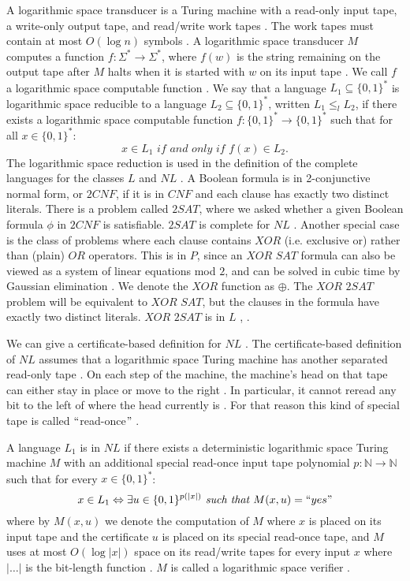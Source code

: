 \documentclass[a4paper,UKenglish,cleveref, autoref]{lipics-v2019}
\begin{document}
A logarithmic space transducer is a Turing machine with a read-only input tape, a write-only output tape, and read/write work tapes \cite{MS06}. The work tapes must contain at most $O(\log n)$ symbols \cite{MS06}. A logarithmic space transducer $M$ computes a function $f : \Sigma^{*} \rightarrow \Sigma^{*}$, where $f(w)$ is the string remaining on the output tape after $M$ halts when it is started with $w$ on its input tape \cite{MS06}. We call $f$ a logarithmic space computable function \cite{MS06}. We say that a language $L_{1} \subseteq \{0, 1\}^{*}$ is logarithmic space reducible to a language $L_{2} \subseteq \{0, 1\}^{*}$, written $L_{1} \leq_{l} L_{2}$, if there exists a logarithmic space computable function $f : \{0, 1\}^{*} \rightarrow \{0, 1\}^{*}$ such that for all $x \in \{0, 1\}^{*}$:
\[x \in L_{1} \textit{ if and only if } f(x) \in L_{2}.\]
The logarithmic space reduction is used in the definition of the complete languages for the classes $L$ and $NL$ \cite{Pap03}. A Boolean formula is in 2-conjunctive normal form, or $2CNF$, if it is in $CNF$ and each clause has exactly two distinct literals. There is a problem called $2SAT$, where we asked whether a given Boolean formula $\phi$ in $2CNF$ is satisfiable. $2SAT$ is complete for $NL$ \cite{Pap03}. Another special case is the class of problems where each clause contains $XOR$ (i.e. exclusive or) rather than (plain) $OR$ operators. This is in $P$, since an $\textit{XOR SAT}$ formula can also be viewed as a system of linear equations mod $2$, and can be solved in cubic time by Gaussian elimination \cite{MM11}. We denote the $XOR$ function as $\oplus$. The $\textit{XOR 2SAT}$ problem will be equivalent to $\textit{XOR SAT}$, but the clauses in the formula have exactly two distinct literals. $\textit{XOR 2SAT}$ is in $L$ \cite{AR00}, \cite{RM08}.

We can give a certificate-based definition for $NL$ \cite{AB09}. The certificate-based definition of $NL$ assumes that a logarithmic space Turing machine has another separated read-only tape \cite{AB09}. On each step of the machine, the machine's head on that tape can either stay in place or move to the right \cite{AB09}. In particular, it cannot reread any bit to the left of where the head currently is \cite{AB09}. For that reason this kind of special tape is called $``$read-once$"$ \cite{AB09}.

\begin{definition}
A language $L_{1}$ is in $NL$ if there exists a deterministic logarithmic space Turing machine $M$ with an additional special read-once input tape polynomial $p: \mathbb{N} \rightarrow \mathbb{N}$ such that for every $x \in \{0, 1\}^{*}$:
\[x \in L_{1} \Leftrightarrow \exists u \in \{0, 1\}^{p(|x|)} \textit{ such that } M(x, u) = ``yes" \]
where by $M(x, u)$ we denote the computation of $M$ where $x$ is placed on its input tape and the certificate $u$ is placed on its special read-once tape, and $M$ uses at most $O(\log |x|)$ space on its read/write tapes for every input $x$ where $|\ldots|$ is the bit-length function \cite{AB09}. $M$ is called a logarithmic space verifier \cite{AB09}.
\end{definition}
\end{document}
